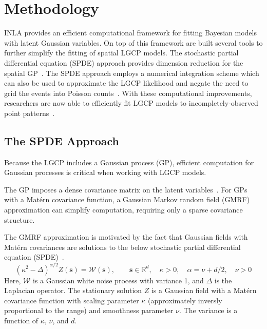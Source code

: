 \documentclass[]{interact}
\begin{document}



\section{Methodology}

INLA provides an efficient computational framework for fitting Bayesian models
with latent Gaussian variables. On top of this framework are built several
tools to further simplify the fitting of spatial LGCP models. The stochastic
partial differential equation (SPDE) approach provides dimension reduction for
the spatial GP~\cite{lindgrenetal}. The SPDE approach employs a numerical
integration scheme which can also be used to approximate the LGCP likelihood
and negate the need to grid the events into Poisson counts~\cite{simpsonetal}.
With these computational improvements, researchers are now able to efficiently
fit LGCP models to incompletely-observed point patterns~\cite{yuanetal}.  


\subsection{The SPDE Approach}

Because the LGCP includes a Gaussian process (GP), efficient computation for
Gaussian processes is critical when working with LGCP models.

The GP imposes a dense covariance matrix on the latent variables~\cite{rinla}.
For GPs with a Mat\'{e}rn covariance function, a Gaussian Markov random field
(GMRF) approximation can simplify computation, requiring only a sparse
covariance structure.

The GMRF approximation is motivated by the fact that Gaussian fields with
Mat\'{e}rn covariances are solutions to the below stochastic partial
differential equation (SPDE)~\cite{lindgrenetal}.
\begin{displaymath}
(\kappa^{2} - \Delta)^{\alpha / 2} Z(\mathbf{s}) = \mathcal{W}(\mathbf{s}),
\qquad \mathbf{s} \in \mathbb{R}^d, \quad \kappa > 0,
\quad \alpha = \nu + d/2, \quad \nu > 0
\end{displaymath}
Here, \(\mathcal{W}\) is a Gaussian white noise process with variance 1, and
\(\Delta\) is the Laplacian operator. The stationary solution \(Z\) is a
Gaussian field with a Mat\'{e}rn covariance function with scaling parameter
\(\kappa\) (approximately inversly proportional to the range) and smoothness
parameter \(\nu\). The variance is a function of \(\kappa\), \(\nu\), and
\(d\).
\end{document}

